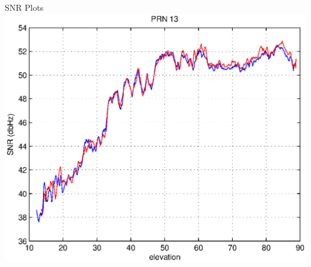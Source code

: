 \documentclass{beamer}
\begin{document}
\begin{frame}{SNR Plots}
  \includegraphics[width=1\linewidth]{img/snr_prn13.eps}
\end{frame}


\begin{frame}{}
\end{frame}
\end{document}
